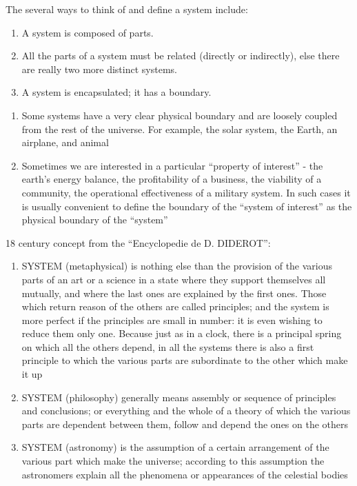 
The several ways to think of and define a system include:
\begin{enumerate}
	\item A system is composed of parts.
	\item All the parts of a system must be related (directly or indirectly), else there are really two more distinct systems.
	\item A system is encapsulated; it has a boundary.
\end{enumerate}

\begin{enumerate}
	\item Some systems have a very clear physical boundary and are loosely coupled from the rest of the universe. For example, the solar system, the Earth, an airplane, and animal
	\item Sometimes we are interested in a particular ``property of interest'' - the earth’s energy balance, the profitability of a business, the viability of a community, the operational effectiveness of a military system. In such cases it is usually convenient to define the boundary of the ``system of interest'' as the physical boundary of the ``system''
\end{enumerate}

18 century concept from the ``Encyclopedie de D. DIDEROT'':
\begin{enumerate}
	\item SYSTEM (metaphysical) is nothing else than the provision of the various parts of an art or a science in a state where they support themselves all mutually, and where the last ones are explained by the first ones. Those which return reason of the others are called principles; and the system is more perfect if the principles are small in number: it is even wishing to reduce them only one. Because just as in a clock, there is a principal spring on which all the others depend, in all the systems there is also a first principle to which the various parts are subordinate to the other which make it up
	\item SYSTEM (philosophy) generally means assembly or sequence of principles and conclusions; or everything and the whole of a theory of which the various parts are dependent between them, follow and depend the ones on the others
	\item SYSTEM (astronomy) is the assumption of a certain arrangement of the various part which make the universe; according to this assumption the astronomers explain all the phenomena or appearances of the celestial bodies
\end{enumerate}

